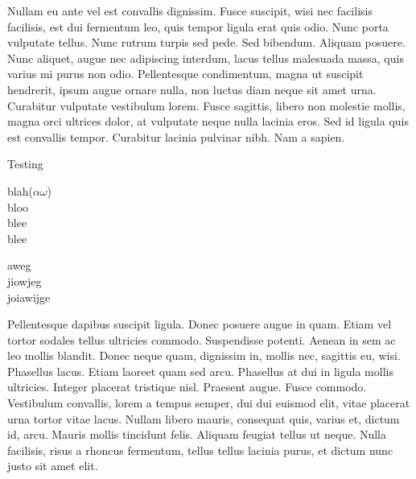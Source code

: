 \documentclass[class=article, crop=false]{standalone}
\title{\titlelink{\event_chaintitle}{}}
\author{John Grey}
\date{May 11, 2022}
\def\event_chaintitle{Event Chain Examples}
\begin{document}
\IfStandalone{\maketitle}{\chapterlink*{\event_chaintitle}{}}


Nullam eu ante vel est convallis dignissim.  Fusce suscipit, wisi nec facilisis
facilisis, est dui fermentum leo, quis tempor ligula erat quis odio.  Nunc porta
vulputate tellus.  Nunc rutrum turpis sed pede.  Sed bibendum.  Aliquam posuere.
Nunc aliquet, augue nec adipiscing interdum, lacus tellus malesuada massa, quis
varius mi purus non odio.  Pellentesque condimentum, magna ut suscipit
hendrerit, ipsum augue ornare nulla, non luctus diam neque sit amet urna.
Curabitur vulputate vestibulum lorem.  Fusce sagittis, libero non molestie
mollis, magna orci ultrices dolor, at vulputate neque nulla lacinia eros.  Sed
id ligula quis est convallis tempor.  Curabitur lacinia pulvinar nibh.  Nam a
sapien.



\begin{eventchain}{Testing}
  \eventStart
  \eventContinue
  \begin{changes}[left]
    blah($ \alpha \omega $) \\
    bloo\\
    blee\\
    blee\\
  \end{changes}
  \begin{fluents}[right]
     
  \end{fluents}
  \begin{changes}[left]
    aweg\\
    jiowjeg\\
    joiawijge\\
  \end{changes}
  \eventFinish
\end{eventchain}

Pellentesque dapibus suscipit ligula.  Donec posuere augue in quam.  Etiam vel
tortor sodales tellus ultricies commodo.  Suspendisse potenti.  Aenean in sem ac
leo mollis blandit.  Donec neque quam, dignissim in, mollis nec, sagittis eu,
wisi.  Phasellus lacus.  Etiam laoreet quam sed arcu.  Phasellus at dui in
ligula mollis ultricies.  Integer placerat tristique nisl.  Praesent augue.
Fusce commodo.  Vestibulum convallis, lorem a tempus semper, dui dui euismod
elit, vitae placerat urna tortor vitae lacus.  Nullam libero mauris, consequat
quis, varius et, dictum id, arcu.  Mauris mollis tincidunt felis.  Aliquam
feugiat tellus ut neque.  Nulla facilisis, risus a rhoncus fermentum, tellus
tellus lacinia purus, et dictum nunc justo sit amet elit.
\end{document}
